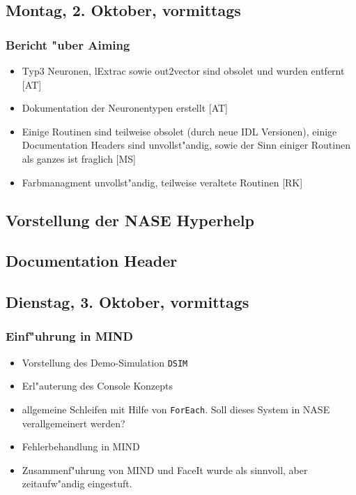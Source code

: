 \documentclass[12pt]{article}
\begin{document}
\subsection{Montag, 2. Oktober, vormittags}

\subsubsection{Bericht "uber Aiming}
\begin{itemize}
\item Typ3 Neuronen, lExtrac sowie out2vector sind obsolet und wurden entfernt [AT]
\item Dokumentation der Neuronentypen erstellt [AT]
\item Einige Routinen sind teilweise obsolet (durch neue IDL Versionen), einige Documentation Headers sind unvollst"andig, sowie der Sinn einiger Routinen als ganzes ist fraglich [MS]
\item Farbmanagment unvollst"andig, teilweise veraltete Routinen [RK]
\end{itemize}

\subsection{Vorstellung der NASE Hyperhelp}

\subsection{Documentation Header}




\subsection{Dienstag, 3. Oktober, vormittags}

\subsubsection{Einf"uhrung in MIND}
\begin{itemize}
\item Vorstellung des Demo-Simulation \texttt{DSIM}
\item Erl"auterung des Console Konzepts
\item allgemeine Schleifen mit Hilfe von \texttt{ForEach}. Soll dieses System in NASE verallgemeinert werden?
\item Fehlerbehandlung in MIND
\item Zusammenf"uhrung  von MIND und FaceIt wurde als sinnvoll, aber zeitaufw"andig eingestuft.
\end{itemize}
\end{document}

